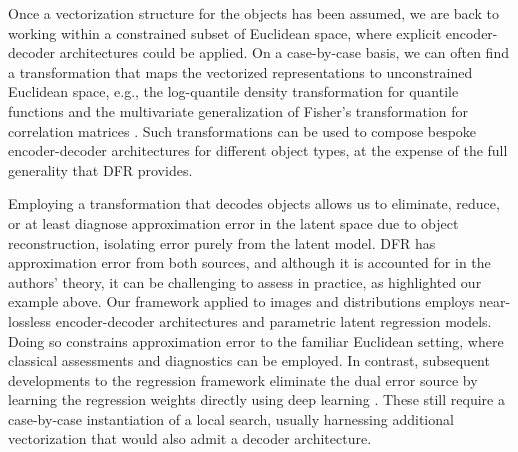 Once a vectorization structure for the objects has been assumed, we are back to working within a constrained subset of Euclidean space, where explicit encoder-decoder architectures could be applied.
On a case-by-case basis, we can often find a transformation that maps the vectorized representations to unconstrained Euclidean space, e.g., the log-quantile density transformation for quantile functions \parencite{petersen_functional_2016} and the multivariate generalization of Fisher’s transformation for correlation matrices \parencite{desai_connectivity_2023}.
Such transformations can be used to compose bespoke encoder-decoder architectures for different object types, at the expense of the full generality that DFR provides.

Employing a transformation that decodes objects allows us to eliminate, reduce, or at least diagnose approximation error in the latent space due to object reconstruction, isolating error purely from the latent model.
DFR has approximation error from both sources, and although it is accounted for in the authors' theory, it can be challenging to assess in practice, as highlighted our example above. 
Our framework applied to images \parencite{gunning2026statistical} and distributions \parencite{stanley_2026_representation} employs near-lossless encoder-decoder architectures and parametric latent regression models.
Doing so constrains approximation error to the familiar Euclidean setting, where classical assessments and diagnostics can be employed.
In contrast, subsequent developments to the \Frechet regression framework eliminate the dual error source by
learning the regression weights directly using deep learning \parencite{zhou_end--end_2026}. 
These still require a case-by-case instantiation of a local search, usually harnessing additional vectorization that would also admit a decoder architecture.